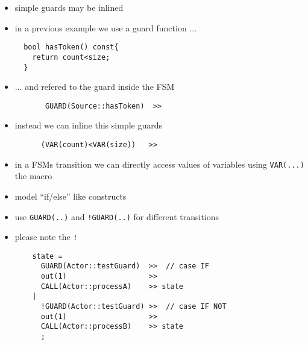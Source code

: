 \begin{frame}[fragile=singleslide]
\begin{itemize}
\item simple guards may be inlined
\item in a previous example we use a guard function ...
\begin{lstlisting}
  bool hasToken() const{
    return count<size;
  }
\end{lstlisting}
\item ... and refered to the guard inside the FSM 
\begin{lstlisting}
       GUARD(Source::hasToken)  >>
\end{lstlisting}
\item instead we can inline this simple guards
\begin{lstlisting}
      (VAR(count)<VAR(size))   >>
\end{lstlisting}
\item in a FSMs transition we can directly access values of variables using \lstinline!VAR(...)! the macro
\end{itemize}
\end{frame}





\begin{frame}[fragile=singleslide]
\begin{itemize}
\item model ``if/else'' like constructs
\item use \lstinline|GUARD(..)| and  \lstinline|!GUARD(..)| for different transitions
\item please note the \lstinline|!|
\begin{lstlisting}
    state = 
      GUARD(Actor::testGuard)  >>  // case IF
      out(1)                   >>
      CALL(Actor::processA)    >> state
    |
      !GUARD(Actor::testGuard) >>  // case IF NOT
      out(1)                   >>
      CALL(Actor::processB)    >> state
      ;
\end{lstlisting}
\end{itemize}
\end{frame}





